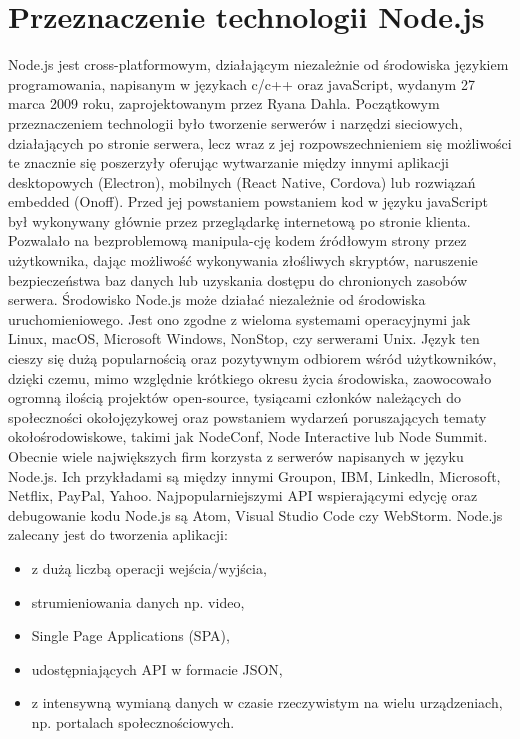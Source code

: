 \documentclass[12pt]{report}
\begin{document}
  \section{Przeznaczenie technologii Node.js}
    Node.js jest cross-platformowym, działającym niezależnie od środowiska językiem programowania, napisanym w językach c/c++ oraz javaScript, wydanym 27 marca 2009 roku, zaprojektowanym przez Ryana Dahla.
    Początkowym przeznaczeniem technologii było tworzenie serwerów i narzędzi sieciowych, działających po stronie serwera, lecz wraz z jej rozpowszechnieniem się możliwości te znacznie się poszerzyły oferując wytwarzanie między innymi aplikacji desktopowych (Electron), mobilnych (React Native, Cordova) lub rozwiązań embedded (Onoff).
    Przed jej powstaniem powstaniem kod w języku javaScript był wykonywany głównie przez przeglądarkę internetową po stronie klienta. Pozwalało na bezproblemową manipula-cję kodem źródłowym strony przez użytkownika, dając możliwość wykonywania złośliwych skryptów, naruszenie bezpieczeństwa baz danych lub uzyskania dostępu do chronionych zasobów serwera.
    Środowisko Node.js może działać niezależnie od środowiska uruchomieniowego.
    Jest ono zgodne z wieloma systemami operacyjnymi jak  Linux, macOS, Microsoft Windows, NonStop, czy serwerami Unix.
    Język ten cieszy się dużą popularnością oraz pozytywnym odbiorem wśród użytkowników, dzięki czemu, mimo względnie krótkiego okresu życia środowiska, zaowocowało ogromną ilością projektów open-source, tysiącami członków należących do społeczności okołojęzykowej oraz powstaniem wydarzeń poruszających tematy okołośrodowiskowe, takimi jak NodeConf, Node Interactive lub Node Summit.
    Obecnie wiele największych firm korzysta z serwerów napisanych w języku Node.js.
    Ich przykładami są między innymi Groupon, IBM, Linkedln, Microsoft, Netflix, PayPal, Yahoo.
    Najpopularniejszymi API wspierającymi edycję oraz debugowanie kodu Node.js są Atom, Visual Studio Code czy WebStorm.
    \newline Node.js zalecany jest do tworzenia aplikacji: 
    \begin{itemize}
      \item z dużą liczbą operacji wejścia/wyjścia,
      \item strumieniowania danych np. video, 
      \item Single Page Applications (SPA),
      \item udostępniających API w formacie JSON,
      \item z intensywną wymianą danych w czasie rzeczywistym na wielu urządzeniach, np. portalach społecznościowych.
    \end{itemize} 
\end{document}
